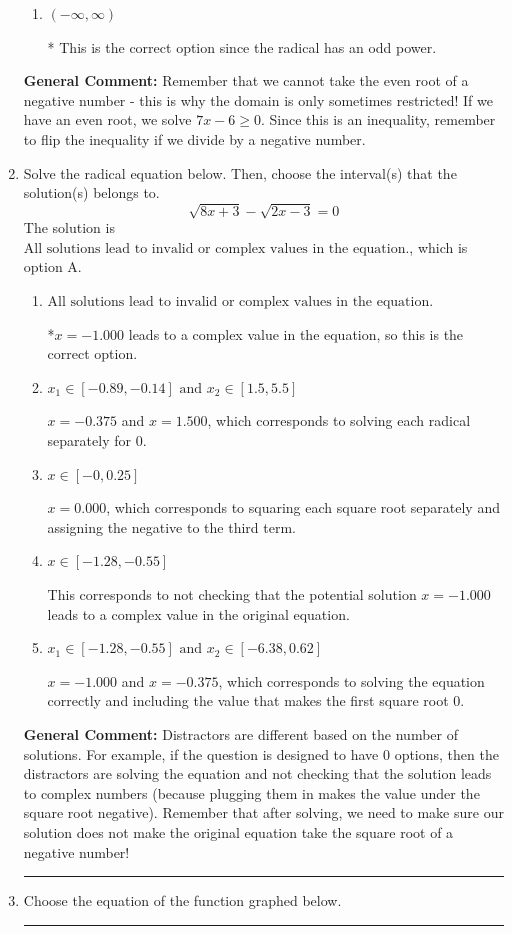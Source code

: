 \documentclass{extbook}[14pt]
\newcommand{\litem}[1]{\item #1

\rule{\textwidth}{0.4pt}}
\begin{document}
\begin{enumerate}
{\begin{enumerate}[label=\Alph*.]
$[1.167, \infty)$, which corresponds to if the radical had an even power AND using the negative of the correct pivot value.
\item \( (-\infty, \infty) \)

* This is the correct option since the radical has an odd power.
\end{enumerate}

\textbf{General Comment:} Remember that we cannot take the even root of a negative number - this is why the domain is only sometimes restricted! If we have an even root, we solve $7 x - 6 \geq 0$. Since this is an inequality, remember to flip the inequality if we divide by a negative number.
}
\litem{
Solve the radical equation below. Then, choose the interval(s) that the solution(s) belongs to.
\[ \sqrt{8 x + 3} - \sqrt{2 x - 3} = 0 \]The solution is \( \text{All solutions lead to invalid or complex values in the equation.} \), which is option A.\begin{enumerate}[label=\Alph*.]
\item \( \text{All solutions lead to invalid or complex values in the equation.} \)

*$x = -1.000$ leads to a complex value in the equation, so this is the correct option.
\item \( x_1 \in [-0.89, -0.14] \text{ and } x_2 \in [1.5,5.5] \)

$x = -0.375$ and $x = 1.500$, which corresponds to solving each radical separately for 0.
\item \( x \in [-0,0.25] \)

$x = 0.000$, which corresponds to squaring each square root separately and assigning the negative to the third term.
\item \( x \in [-1.28,-0.55] \)

This corresponds to not checking that the potential solution $x = -1.000$ leads to a complex value in the original equation.
\item \( x_1 \in [-1.28, -0.55] \text{ and } x_2 \in [-6.38,0.62] \)

$x = -1.000$ and $x = -0.375$, which corresponds to solving the equation correctly and including the value that makes the first square root 0.
\end{enumerate}

\textbf{General Comment:} Distractors are different based on the number of solutions. For example, if the question is designed to have 0 options, then the distractors are solving the equation and not checking that the solution leads to complex numbers (because plugging them in makes the value under the square root negative). Remember that after solving, we need to make sure our solution does not make the original equation take the square root of a negative number!
}
\litem{
Choose the equation of the function graphed below.

}
\end{enumerate}
\end{document}
